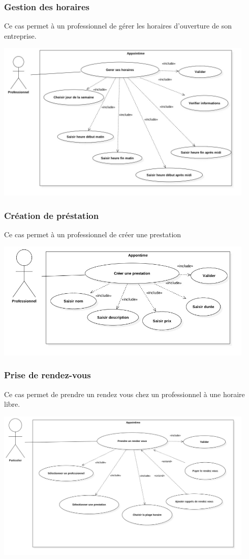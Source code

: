 \documentclass{article}
\begin{document}
\subsubsection{Gestion des horaires}
Ce cas permet à un professionnel de gérer les horaires d'ouverture de son entreprise.
\begin{center}
  \includegraphics[width=350pt]{diagram/useCaseGererHoraire}
\end{center}

\subsubsection{Création de préstation}
Ce cas permet à un professionnel de créer une prestation
\begin{center}
  \includegraphics[width=350pt]{diagram/useCaseCreerPrestation}
\end{center}
\subsubsection{Prise de rendez-vous}
Ce cas permet de prendre un rendez vous chez un professionnel à une horaire libre.
\begin{center}
  \includegraphics[width=350pt]{diagram/useCasePriseRdv}
\end{center}
\end{document}

